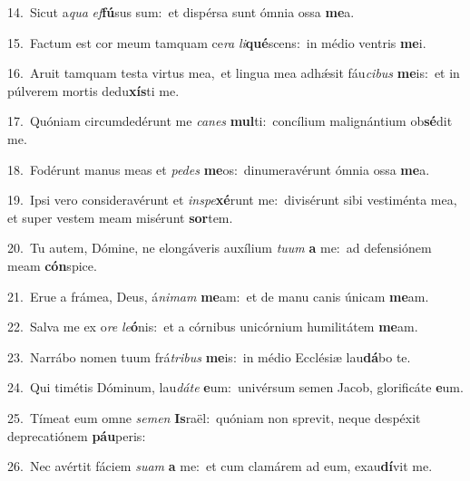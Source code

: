 {\numbfont\textcolor{\numbcolor}{14.}}~Sicut a\textit{qua} \textit{ef}\-\textbf{fú}sus sum:~\star et dispérsa sunt ómnia ossa \textbf{me}\-a.\par
{\numbfont\textcolor{\numbcolor}{15.}}~Factum est cor meum tamquam ce\textit{ra} \textit{li}\-\textbf{qué}scens:~\star in médio ventris \textbf{me}\-i.\par
{\numbfont\textcolor{\numbcolor}{16.}}~Aruit tamquam testa virtus mea,~\dagger et lingua mea adhǽsit fáu\-\textit{ci}\-\textit{bus} \textbf{me}\-is:~\star et in púlverem mortis dedu\-\textbf{xís}\-ti me.\par
{\numbfont\textcolor{\numbcolor}{17.}}~Quóniam circumdedérunt me \textit{ca}\-\textit{nes} \textbf{mul}\-ti:~\star concílium malignántium ob\-\textbf{sé}\-dit me.\par
{\numbfont\textcolor{\numbcolor}{18.}}~Fodérunt manus meas et \textit{pe}\-\textit{des} \textbf{me}\-os:~\star dinumeravérunt ómnia ossa \textbf{me}\-a.\par
{\numbfont\textcolor{\numbcolor}{19.}}~Ipsi vero consideravérunt et \textit{in}\-\textit{spe}\textbf{xé}runt me:~\star divisérunt sibi vestiménta mea, et super vestem meam misérunt \textbf{sor}\-tem.\par
{\numbfont\textcolor{\numbcolor}{20.}}~Tu autem, Dómine, ne elongáveris auxílium \textit{tu}\-\textit{um} \textbf{a} me:~\star ad defensiónem meam \textbf{cón}\-spice.\par
{\numbfont\textcolor{\numbcolor}{21.}}~Erue a frámea, Deus, á\-\textit{ni}\-\textit{mam} \textbf{me}\-am:~\star et de manu canis únicam \textbf{me}\-am.\par
{\numbfont\textcolor{\numbcolor}{22.}}~Salva me ex o\textit{re} \textit{le}\-\textbf{ó}nis:~\star et a córnibus unicórnium humilitátem \textbf{me}\-am.\par
{\numbfont\textcolor{\numbcolor}{23.}}~Narrábo nomen tuum frá\-\textit{tri}\-\textit{bus} \textbf{me}\-is:~\star in médio Ecclésiæ lau\-\textbf{dá}\-bo te.\par
{\numbfont\textcolor{\numbcolor}{24.}}~Qui timétis Dóminum, lau\-\textit{dá}\-\textit{te} \textbf{e}\-um:~\star univérsum semen Jacob, glorificáte \textbf{e}\-um.\par
{\numbfont\textcolor{\numbcolor}{25.}}~Tímeat eum omne \textit{se}\-\textit{men} \textbf{Is}\-raël:~\star quóniam non sprevit, neque despéxit deprecatiónem \textbf{páu}\-peris:\par
{\numbfont\textcolor{\numbcolor}{26.}}~Nec avértit fáciem \textit{su}\-\textit{am} \textbf{a} me:~\star et cum clamárem ad eum, exau\-\textbf{dí}\-vit me.\par
